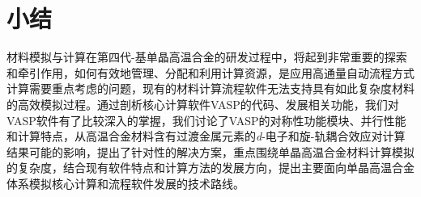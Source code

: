 \section{小结}
材料模拟与计算在第四代-基单晶高温合金的研发过程中，将起到非常重要的探索和牵引作用，如何有效地管理、分配和利用计算资源，是应用高通量自动流程方式计算需要重点考虑的问题，现有的材料计算流程软件无法支持具有如此复杂度材料的高效模拟过程。通过剖析核心计算软件\textrm{VASP}的代码、发展相关功能，我们对\textrm{VASP}软件有了比较深入的掌握，我们讨论了\textrm{VASP}的对称性功能模块、并行性能和计算特点，从高温合金材料含有过渡金属元素的\textit{d}-电子和旋-轨耦合效应对计算结果可能的影响，提出了针对性的解决方案，重点围绕单晶高温合金材料计算模拟的复杂度，结合现有软件特点和计算方法的发展方向，提出主要面向单晶高温合金体系模拟核心计算和流程软件发展的技术路线。
